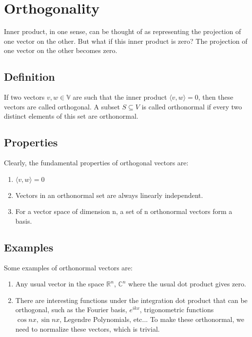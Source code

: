 \section{Orthogonality}

Inner product, in one sense, can be thought of as representing the projection of one vector on the other. But what if this inner product is zero? The projection of one vector on the other becomes zero. 


\subsection{Definition}

If two vectors $v,w \in \mathbb{V}$ are such that the inner product $\langle v,w \rangle =0$, then these vectors are called orthogonal. A subset $S \subseteq V
$ is called orthonormal if every two distinct elements of this set are orthonormal. 


\subsection{Properties}

Clearly, the fundamental properties of orthogonal vectors are:

\begin{enumerate}
    \item $\langle v,w \rangle =0$
    \item Vectors in an orthonormal set are always linearly independent. 
    \item For a vector space of dimension n, a set of n orthonormal vectors form a basis. 
\end{enumerate}

\subsection{Examples}
Some examples of orthonormal vectors are:

\begin{enumerate}
    \item Any usual vector in the space $\mathbb{R}^n$, $\mathbb{C}^n$ where the usual dot product gives zero.
    \item There are interesting functions under the integration dot product that can be orthogonal, such as the Fourier basis, $e^{ikx}$, trigonometric functions $\cos nx,\sin nx$, Legendre Polynomials, etc... To make these orthonormal, we need to normalize these vectors, which is trivial. 
\end{enumerate}

